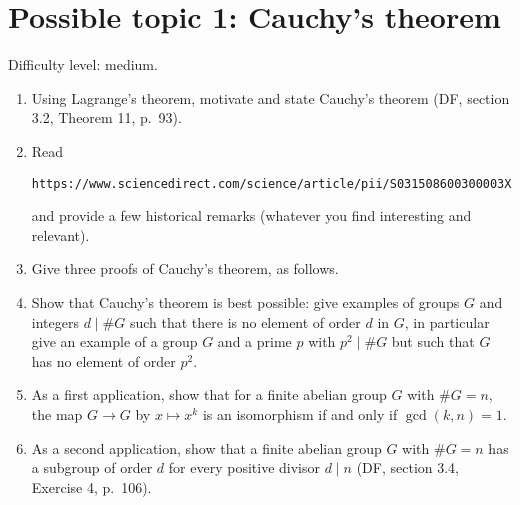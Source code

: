 \section*{Possible topic 1: Cauchy's theorem}
Difficulty level: medium.
\begin{enumerate}[label=\arabic{enumi}.]
  \item Using Lagrange's theorem, motivate and state Cauchy's theorem (DF, section 
  3.2, Theorem 11, p.~93).  
  \item Read
  \begin{center}
  \verb|https://www.sciencedirect.com/science/article/pii/S031508600300003X|
  \end{center}
  and provide a few historical remarks (whatever you find interesting and relevant). 
  \item Give three proofs of Cauchy's theorem, as follows.
  \item Show that Cauchy's theorem is best possible: give examples of groups $G$ and 
  integers $d \mid \#G$ such that there is no element of order $d$ in $G$, in 
  particular give an example of a group $G$ and a prime $p$ with $p^2 \mid \#G$ but 
  such that $G$ has no element of order $p^2$.  
  \item As a first application, show that for a finite abelian group $G$ with 
    $\#G=n$, the map $G \to G$ by $x \mapsto x^k$ is an isomorphism if and only if
    $\gcd(k,n)=1$.  
  \item As a second application, show that a finite abelian group $G$ with $\#G = n$ 
  has a subgroup of order $d$ for every positive divisor $d \mid n$ (DF, section 3.4,
  Exercise 4, p.~106).
\end{enumerate}
